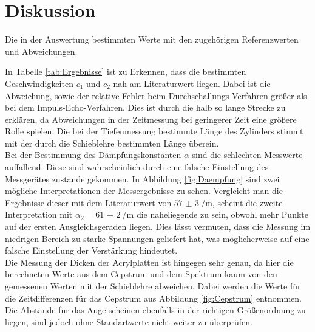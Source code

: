
\section{Diskussion}
\label{sec:Diskussion}

\begin{table}
	\centering
	\caption{Die in der Auswertung bestimmten Werte mit den zugehörigen Referenzwerten und Abweichungen.}
	
	\label{tab:Ergebnisse}
\end{table}

\noindent In Tabelle \ref{tab:Ergebnisse} ist zu Erkennen, dass die bestimmten Geschwindigkeiten $c_1$ und $c_2$ nah am Literaturwert liegen. Dabei ist die Abweichung, sowie der relative Fehler beim Durchschallungs-Verfahren größer als bei dem Impuls-Echo-Verfahren. Dies ist durch die halb so lange Strecke zu erklären, da Abweichungen in der Zeitmessung bei geringerer Zeit eine größere Rolle spielen. Die bei der Tiefenmessung bestimmte Länge des Zylinders stimmt mit der durch die Schieblehre bestimmten Länge überein.\\
Bei der Bestimmung des Dämpfungskonstanten $\alpha$ sind die schlechten Messwerte auffallend. Diese sind wahrscheinlich durch eine falsche Einstellung des Messgerätes zustande gekommen. In Abbildung \ref{fig:Daempfung} sind zwei mögliche Interpretationen der Messergebnisse zu sehen. Vergleicht man die Ergebnisse dieser mit dem Literaturwert von $\SI{57(3)}{\per\metre}$, scheint die zweite Interpretation mit $\alpha_2=\SI{61(2)}{\per\metre}$ die naheliegende zu sein, obwohl mehr Punkte auf der ersten Ausgleichsgeraden liegen. Dies lässt vermuten, dass die Messung im niedrigen Bereich zu starke Spannungen geliefert hat, was möglicherweise auf eine falsche Einstellung der Verstärkung hindeutet.\\
Die Messung der Dicken der Acrylplatten ist hingegen sehr genau, da hier die berechneten Werte aus dem Cepstrum und dem Spektrum kaum von den gemessenen Werten mit der Schieblehre abweichen. Dabei werden die Werte für die Zeitdifferenzen für das Cepstrum aus Abbildung \ref{fig:Cepstrum} entnommen. Die Abstände für das Auge scheinen ebenfalls in der richtigen Größenordnung zu liegen, sind jedoch ohne Standartwerte nicht weiter zu überprüfen.     